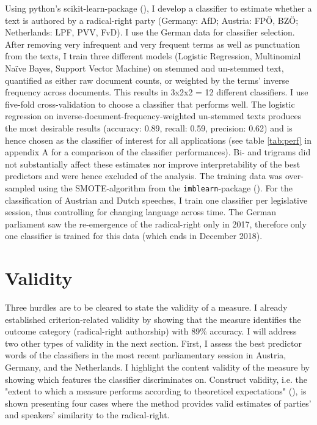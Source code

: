 \documentclass{article}
\begin{document}
Using python’s scikit-learn-package (\cite{Pedregosa2011}), I develop a classifier to estimate whether a text is authored by a radical-right party (Germany: AfD; Austria: FPÖ, BZÖ; Netherlands: LPF, PVV, FvD). I use the German data for classifier selection. After removing very infrequent and very frequent terms as well as punctuation from the texts, I train three different models (Logistic Regression, Multinomial Naïve Bayes, Support Vector Machine) on stemmed and un-stemmed text, quantified as either raw document counts, or weighted by the terms' inverse frequency across documents. This results in 3x2x2 = 12 different classifiers. I use five-fold cross-validation to choose a classifier that performs well. The logistic regression on inverse-document-frequency-weighted un-stemmed texts produces the most desirable results (accuracy: 0.89, recall: 0.59, precision: 0.62) and is hence chosen as the classifier of interest for all applications (see table \ref{tab:perf} in appendix A for a comparison of the classifier performances). Bi- and trigrams did not substantially affect these estimates nor improve interpretability of the best predictors and were hence excluded of the analysis. The training data was over-sampled using the SMOTE-algorithm from the \texttt{imblearn}-package (\cite{Lemaitre2017}). For the classification of Austrian and Dutch speeches, I train one classifier per legislative session, thus controlling for changing language across time. The German parliament saw the re-emergence of the radical-right only in 2017, therefore only one classifier is trained for this data (which ends in December 2018). \par


\section{Validity}
Three hurdles are to be cleared to state the validity of a measure. I already established criterion-related validity by showing that the measure identifies the outcome category (radical-right authorship) with 89\% accuracy. I will address two other types of validity in the next section. First, I assess the best predictor words of the classifiers in the most recent parliamentary session in Austria, Germany, and the Netherlands. I highlight the content validity of the measure by showing which features the classifier discriminates on. Construct validity, i.e. the "extent to which a measure performs according to theoreticel expectations" (\cite{Carmines2004Validity}), is shown presenting four cases where the method provides valid estimates of parties' and speakers' similarity to the radical-right. \par
\end{document}
